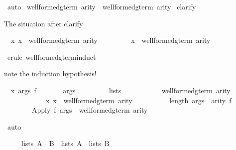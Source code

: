 \begin{isabellebody}
\begin{isamarkuptxt}
\begin{isabelle}
\end{isabelle}%
\end{isamarkuptxt}%
\ auto\isanewline
{}\isanewline
\isanewline
\isanewline
\isanewline
{}\ {\isachardoublequote}well{\isacharunderscore}formed{\isacharunderscore}gterm{\isacharprime}\ arity\ {\isasymsubseteq}\ well{\isacharunderscore}formed{\isacharunderscore}gterm\ arity{\isachardoublequote}\isanewline
{}\ clarify%
\begin{isamarkuptxt}%
The situation after clarify
\begin{isabelle}%
\ {}{\isachardot}\ {\isasymAnd}x{\isachardot}\ x\ {\isasymin}\ well{\isacharunderscore}formed{\isacharunderscore}gterm{\isacharprime}\ arity\ {\isasymLongrightarrow}\isanewline
\ \ \ \ \ \ \ \ x\ {\isasymin}\ well{\isacharunderscore}formed{\isacharunderscore}gterm\ arity%
\end{isabelle}%
\end{isamarkuptxt}%
\ {\isacharparenleft}erule\ well{\isacharunderscore}formed{\isacharunderscore}gterm{\isacharprime}{\isachardot}induct{\isacharparenright}%
\begin{isamarkuptxt}%
note the induction hypothesis!
\begin{isabelle}%
\ {}{\isachardot}\ {\isasymAnd}x\ args\ f{\isachardot}\isanewline
\ \ \ \ \ \ \ {\isasymlbrakk}args\isanewline
\ \ \ \ \ \ \ \ {\isasymin}\ lists\isanewline
\ \ \ \ \ \ \ \ \ \ \ {\isacharparenleft}well{\isacharunderscore}formed{\isacharunderscore}gterm{\isacharprime}\ arity\ {\isasyminter}\isanewline
\ \ \ \ \ \ \ \ \ \ \ \ {\isacharbraceleft}x{\isachardot}\ x\ {\isasymin}\ well{\isacharunderscore}formed{\isacharunderscore}gterm\ arity{\isacharbraceright}{\isacharparenright}{\isacharsemicolon}\isanewline
\ \ \ \ \ \ \ \ \ \ length\ args\ {\isacharequal}\ arity\ f{\isasymrbrakk}\isanewline
\ \ \ \ \ \ \ {\isasymLongrightarrow}\ Apply\ f\ args\ {\isasymin}\ well{\isacharunderscore}formed{\isacharunderscore}gterm\ arity%
\end{isabelle}%
\end{isamarkuptxt}%
\ auto\isanewline
{}%
\begin{isamarkuptext}%
\begin{isabelle}%
\ \ \ \ \ lists\ {\isacharparenleft}A\ {\isasyminter}\ B{\isacharparenright}\ {\isacharequal}\ lists\ A\ {\isasyminter}\ lists\ B%
\end{isabelle}%
\end{isamarkuptext}%

\end{isabellebody}

